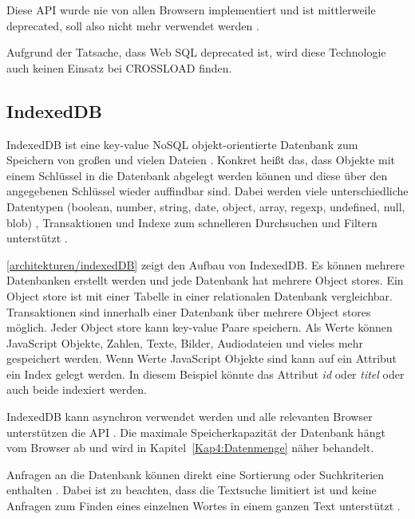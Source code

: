 Diese \ac{API} wurde nie von allen Browsern implementiert und ist mittlerweile deprecated, soll also nicht mehr verwendet werden \autocite{Hajian2019}.

Aufgrund der Tatsache, dass Web SQL deprecated ist, wird diese Technologie auch keinen Einsatz bei CROSSLOAD finden. 

\subsection{IndexedDB}
IndexedDB ist eine key-value NoSQL objekt-orientierte Datenbank zum Speichern von großen und vielen Dateien \autocite{Hajian2019}. Konkret heißt das, dass Objekte mit einem Schlüssel in die Datenbank abgelegt werden können und diese über den angegebenen Schlüssel wieder auffindbar sind. Dabei werden viele unterschiedliche Datentypen (boolean, number, string, date, object, array, regexp, undefined, null, \ac{blob}) \autocite{mdn-indexeddb}, Transaktionen und Indexe zum schnelleren Durchsuchen und Filtern unterstützt \autocite{Sheppard2017}. 

\autoref{architekturen/indexedDB} zeigt den Aufbau von IndexedDB. Es können mehrere Datenbanken erstellt werden und jede Datenbank hat mehrere Object stores. Ein Object store ist mit einer Tabelle in einer relationalen Datenbank vergleichbar. Transaktionen sind innerhalb einer Datenbank über mehrere Object stores möglich. Jeder Object store kann key-value Paare speichern. Als Werte können JavaScript Objekte, Zahlen, Texte, Bilder, Audiodateien und vieles mehr gespeichert werden. Wenn Werte JavaScript Objekte sind kann auf ein Attribut ein Index gelegt werden. In diesem Beispiel könnte das Attribut \textit{id} oder \textit{titel} oder auch beide indexiert werden.


IndexedDB kann asynchron verwendet werden \autocite{Hajian2019} \autocite{mdn-indexeddb} und alle relevanten Browser unterstützen die \ac{API} \autocite{mdn-indexeddb-api}. Die maximale Speicherkapazität der Datenbank hängt vom Browser ab und wird in Kapitel~\ref{Kap4:Datenmenge} näher behandelt.

Anfragen an die Datenbank können direkt eine Sortierung oder Suchkriterien enthalten \autocite{mdn-indexeddb}. Dabei ist zu beachten, dass die Textsuche limitiert ist und keine Anfragen zum Finden eines einzelnen Wortes in einem ganzen Text unterstützt \autocite{mdn-indexeddb}. 

